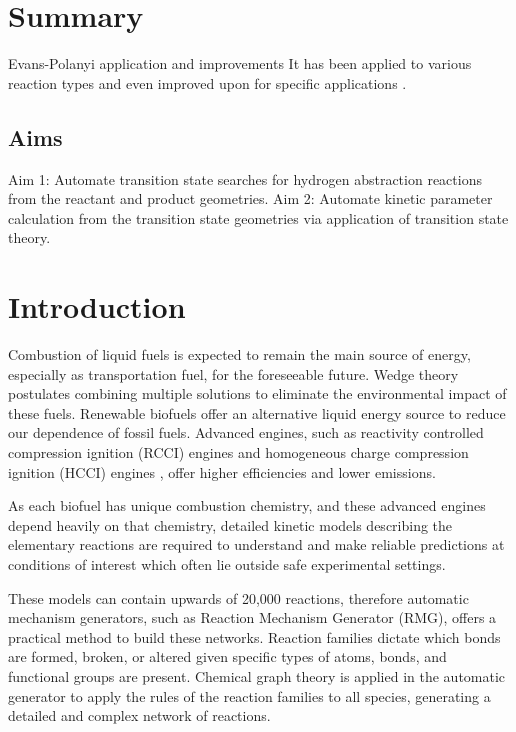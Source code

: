 \documentclass[12pt]{article}
\begin{document}
\title{}
\author{Pierre L. Bhoorasingh}
\date{\today}
\maketitle

\newpage
\tableofcontents

\newpage

\section{Summary}

Evans-Polanyi application and improvements
It has been applied to various reaction types \cite{Wijaya:2003di} \cite{Saeys:2003ku} \cite{Yaluris:1995hc}and even improved upon for specific applications \cite{Blowers:jx}.

\subsection{Aims}
Aim 1: Automate transition state searches for hydrogen abstraction reactions from the reactant and product geometries.
Aim 2: Automate kinetic parameter calculation from the transition state geometries via application of transition state theory.
\section{Introduction}

Combustion of liquid fuels is expected to remain the main source of energy, especially as transportation fuel, for the foreseeable future\cite{Ghoniem:2011iz}. Wedge theory postulates combining multiple solutions to eliminate the environmental impact of these fuels\cite{Pacala:2004hd}. Renewable biofuels offer an alternative liquid energy source to reduce our dependence of fossil fuels. Advanced engines, such as reactivity controlled compression ignition (RCCI) engines \cite{Kokjohn:dh} and homogeneous charge compression ignition (HCCI) engines \cite{Yao:2009ic}, offer higher efficiencies and lower emissions.

As each biofuel has unique combustion chemistry, and these advanced engines depend heavily on that chemistry, detailed kinetic models describing the elementary reactions are required to understand and make reliable predictions at conditions of interest which often lie outside safe experimental settings.

These models can contain upwards of 20,000 reactions, therefore automatic mechanism generators, such as Reaction Mechanism Generator (RMG), offers a practical method to build these networks. Reaction families dictate which bonds are formed, broken, or altered given specific types of atoms, bonds, and functional groups are present. Chemical graph theory \cite{Trinajstic:1991uo} is applied in the automatic generator to apply the rules of the reaction families to all species, generating a detailed and complex network of reactions.
\end{document}
